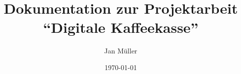 \documentclass[a4paper, 11pt]{report}
\begin{document}
	
\title{Dokumentation zur Projektarbeit "`Digitale Kaffeekasse"'}
\author{Jan Müller}
\date{\today}

\maketitle

\tableofcontents








\clearpage


\clearpage

\end{document}
